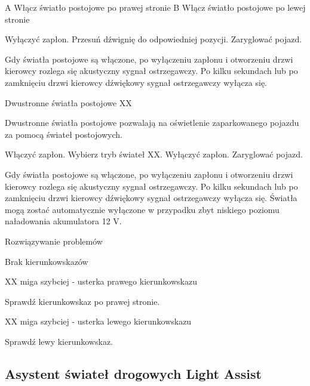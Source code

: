 A Włącz światło postojowe po prawej stronie
B Włącz światło postojowe po lewej stronie
\begin{itemizeArrow}
	\itemArrow Wyłączyć zapłon.
	\itemArrow Przesuń dźwignię do odpowiedniej pozycji.
	\itemArrow Zaryglować pojazd.
\end{itemizeArrow}
Gdy światła postojowe są włączone, po wyłączeniu zapłonu i otworzeniu drzwi kierowcy rozlega się akustyczny sygnał ostrzegawczy. Po kilku sekundach lub po zamknięciu drzwi kierowcy dźwiękowy sygnał ostrzegawczy wyłącza się.

Dwustronne światła postojowe XX

Dwustronne światła postojowe pozwalają na oświetlenie zaparkowanego pojazdu za pomocą świateł postojowych.
\begin{itemizeArrow}
	\itemArrow Włączyć zapłon.
	\itemArrow Wybierz tryb świateł XX.
	\itemArrow Wyłączyć zapłon.
	\itemArrow Zaryglować pojazd.
\end{itemizeArrow}

Gdy światła postojowe są włączone, po wyłączeniu zapłonu i otworzeniu drzwi kierowcy rozlega się akustyczny sygnał ostrzegawczy. Po kilku sekundach
lub po zamknięciu drzwi kierowcy dźwiękowy sygnał ostrzegawczy wyłącza się.
Światła mogą zostać automatycznie wyłączone w przypadku zbyt niskiego poziomu naładowania akumulatora 12 V.



Rozwiązywanie problemów

Brak kierunkowskazów

XX miga szybciej - usterka prawego kierunkowskazu
\begin{itemizeArrow}
	\itemArrow Sprawdź kierunkowskaz po prawej stronie.
\end{itemizeArrow}

XX miga szybciej - usterka lewego kierunkowskazu
\begin{itemizeArrow}
	\itemArrow Sprawdź lewy kierunkowskaz.
\end{itemizeArrow}



\subsection{Asystent świateł drogowych Light Assist}

